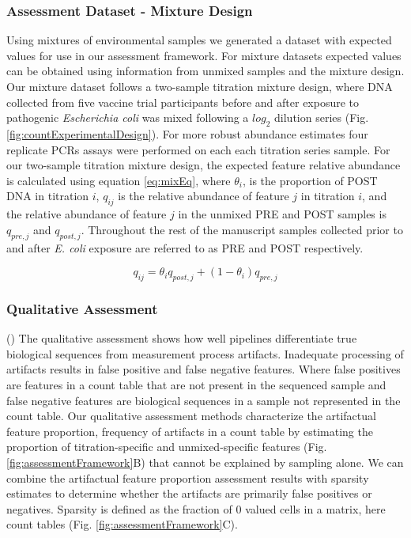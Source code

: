 \documentclass{bmcart}
\begin{document}
\subsubsection*{Assessment Dataset - Mixture Design}

Using mixtures of environmental samples we generated a dataset with expected values for use in our assessment framework. For mixture datasets expected values can be obtained using information from unmixed samples and the mixture design.
Our mixture dataset follows a two-sample titration mixture design, where DNA collected from five vaccine trial participants before and
after exposure to pathogenic \emph{Escherichia coli} was mixed following a \(log_2\) dilution series (Fig. \ref{fig:countExperimentalDesign}).
For more robust abundance estimates four replicate PCRs assays were performed on each each titration series sample.
For our two-sample titration mixture design, the expected feature
relative abundance is calculated using equation \eqref{eq:mixEq},
where \(\theta_i\), is the proportion of POST DNA in titration \(i\),
\(q_{ij}\) is the relative abundance of feature \(j\) in titration
\(i\), and the relative abundance of feature \(j\) in the unmixed PRE
and POST samples is \(q_{pre,j}\) and \(q_{post,j}\).
Throughout the rest of the manuscript samples collected prior to and after \emph{E. coli} exposure are referred to as PRE and POST respectively.

\begin{equation}
  q_{ij} = \theta_i q_{post,j} + (1 - \theta_i) q_{pre,j}
  \label{eq:mixEq}
\end{equation}

\subsubsection*{Qualitative Assessment}
()
The qualitative assessment shows how well pipelines differentiate true biological sequences from measurement process artifacts.
Inadequate processing of artifacts results in false positive and false negative features.
Where false positives are features in a count table that are not present in the sequenced sample and false negative features are biological sequences in a sample not represented in the count table.
Our qualitative assessment methods characterize the artifactual feature proportion, frequency of artifacts in a count table by estimating the proportion of titration-specific and unmixed-specific features (Fig. \ref{fig:assessmentFramework}B) that cannot be explained by sampling alone.
We can combine the artifactual feature proportion assessment results with sparsity estimates to determine whether the artifacts are primarily false positives or negatives.
Sparsity is defined as the fraction of 0 valued cells in a matrix, here count tables (Fig. \ref{fig:assessmentFramework}C).
\end{document}
